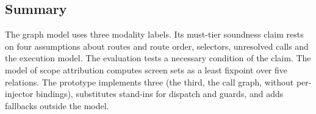 \subsection{Summary}

The graph model uses three modality labels. Its must-tier soundness claim rests on four
assumptions about routes and route order, selectors, unresolved calls and the execution model.
The evaluation tests a necessary condition of the claim. The model of scope attribution computes screen sets as a least fixpoint over five relations.
The prototype implements three (the third, the call graph, without per-injector bindings), substitutes stand-ins for dispatch and guards, and adds
fallbacks outside the model.
